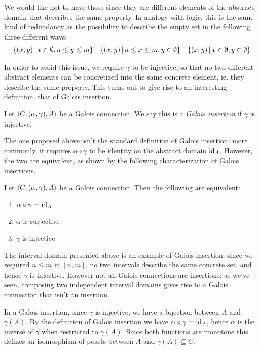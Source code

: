 We would like not to have those since they are different elements of the abstract domain that describes the same property. In analogy with logic, this is the same kind of redundancy as the possibility to describe the empty set in the following three different ways:
\begin{align*}
\{ (x, y) \,\vert\, x \in \emptyset, n \le y \le m \}
&&
\{ (x, y) \,\vert\, n \le x \le m, y \in \emptyset \}
&&
\{ (x, y) \,\vert\, x \in \emptyset, y \in \emptyset \}
\end{align*}

In order to avoid this issue, we require $\gamma$ to be injective, so that no two different abstract elements can be concretized into the same concrete element, ie. they describe the same property. This turns out to give rise to an interesting definition, that of Galois insertion.
\begin{definition}\label{ch2:def:gi}
	Let $\langle C, (\alpha, \gamma), A \rangle$ be a Galois connection. We say this is a \textit{Galois insertion} if $\gamma$ is injective.
\end{definition}

The one proposed above isn't the standard definition of Galois insertion: more commonly, it requires $\alpha \circ \gamma$ to be identity on the abstract domain $\text{id}_A$. However, the two are equivalent, as shown by the following characterization of Galois insertions.
\begin{prop}\label{ch2:th:gi-charact}
	Let $\langle C, (\alpha, \gamma), A \rangle$ be a Galois connection. Then the following are equivalent:
	\begin{enumerate}[label={(\arabic*)}]
		\item $\alpha \circ \gamma = \text{id}_A$
		\item $\alpha$ is surjective
		\item $\gamma$ is injective
	\end{enumerate}
\end{prop}

The interval domain presented above is an example of Galois insertion: since we required $n \le m$ in $[n, m]$, no two intervals describe the same concrete set, and hence $\gamma$ is injective. However not all Galois connections are insertions: as we've seen, composing two independent interval domains gives rise to a Galois connection that isn't an insertion.

In a Galois insertion, since $\gamma$ is injective, we have a bijection between $A$ and $\gamma(A)$. By the definition of Galois insertion we have $\alpha \circ \gamma = \text{id}_A$, hence $\alpha$ is the inverse of $\gamma$ when restricted to $\gamma(A)$. Since both functions are monotone this defines an isomorphism of posets between $A$ and $\gamma(A) \subseteq C$.

